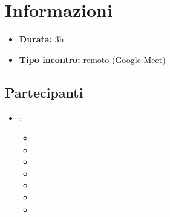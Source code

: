 \section{Informazioni}
\begin{itemize}
	\item \textbf{Durata:} 3h
	\item \textbf{Tipo incontro:} remoto (Google Meet)
\end{itemize}

\subsection{Partecipanti}

\begin{itemize}
	\item \GroupName:
	\begin{itemize}
		\item \stocco
		\item \cristo
		\item \raul
		\item \sebastiano
		\item \mattia
		\item \martina
		\item \riccardo
	\end{itemize}
\end{itemize}

\clearpage
